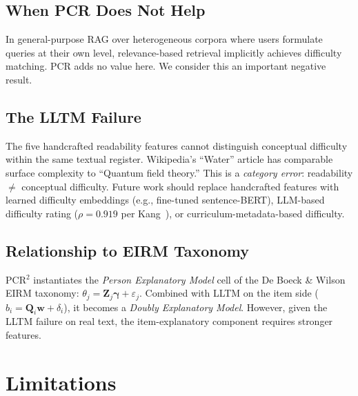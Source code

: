 \documentclass{article}
\begin{document}
\subsection{When PCR Does Not Help}

In general-purpose RAG over heterogeneous corpora where users formulate queries at their own level, relevance-based retrieval implicitly achieves difficulty matching. PCR adds no value here. We consider this an important negative result.

\subsection{The LLTM Failure}

The five handcrafted readability features cannot distinguish conceptual difficulty within the same textual register. Wikipedia's ``Water'' article has comparable surface complexity to ``Quantum field theory.'' This is a \emph{category error}: readability $\neq$ conceptual difficulty. Future work should replace handcrafted features with learned difficulty embeddings (e.g., fine-tuned sentence-BERT), LLM-based difficulty rating ($\rho=0.919$ per Kang~\cite{kang2026pcr}), or curriculum-metadata-based difficulty.

\subsection{Relationship to EIRM Taxonomy}

PCR$^2$ instantiates the \emph{Person Explanatory Model} cell of the De Boeck \& Wilson~\cite{deboeck2004} EIRM taxonomy: $\theta_j = \mathbf{Z}_j\boldsymbol{\gamma} + \varepsilon_j$. Combined with LLTM on the item side ($b_i = \mathbf{Q}_i\mathbf{w} + \delta_i$), it becomes a \emph{Doubly Explanatory Model}. However, given the LLTM failure on real text, the item-explanatory component requires stronger features.

\FloatBarrier
\section{Limitations}
\end{document}
